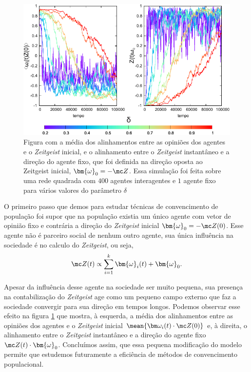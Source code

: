 \begin{figure}
\centering
\includegraphics[width=1.2\textwidth]{Figures/evolveAngulosInit}
\caption{Figura com a média dos alinhamentos entre as opiniões dos agentes
e o \textit{Zeitgeist} inicial, e o alinhamento entre o \textit{Zeitgeist}
instantâneo e a direção do agente fixo, que foi definida na direção
oposta ao Zeitgeist inicial, $\bm{\omega}_0 = - \mc Z$. Essa simulação
foi feita sobre uma rede quadrada com $400$ agentes interagentes e $1$ agente
fixo para vários valores do parâmetro $\delta$} \label{fig:evolveAngulosInit}
\end{figure}


O primeiro passo que demos para estudar técnicas de convencimento de
população foi supor que na população existia um único agente com vetor de
opinião fixo e contrária a direção do \textit{Zeitgeist} inicial
$\bm{\omega}_0 = - \mc Z(0)$.  Esse agente não é parceiro social de
nenhum outro agente, sua  única influência na sociedade é no calculo do
\textit{Zeitgeist}, ou seja,
\begin{equation}
    \mc Z(t) \propto  \sum_{i=1}^k \bm{\omega}_i(t) + \bm{\omega}_0.
\end{equation}

Apesar da influência desse agente na sociedade ser muito pequena, sua
presença na contabilização do \textit{Zeitgeist} age como um pequeno
campo externo que faz a sociedade convergir para sua direção em tempos
longos. Podemos observar esse efeito na figura \ref{fig:evolveAngulosInit} que
mostra, à esquerda, a média dos alinhamentos entre as opiniões dos agentes e o
\textit{Zeitgeist} inicial $\mean{\bm \omega_i(t)\cdot\mc Z(0)}$ e, à direita,
o alinhamento entre o \textit{Zeitgeist} instantâneo e a direção do agente
fixo $\mc Z(t) \cdot \bm{\omega}_0$.  Concluímos assim, que essa pequena
modificação do modelo permite que estudemos futuramente a eficiência
de métodos de convencimento populacional.


